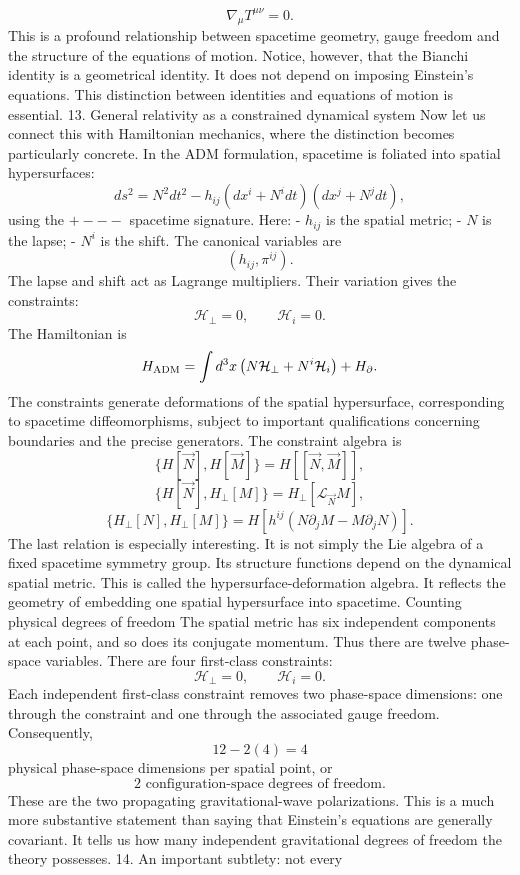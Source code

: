 \[ \nabla_\mu T^{\mu\nu}=0. \] This is a profound relationship between
spacetime geometry, gauge freedom and the structure of the equations of motion.
Notice, however, that the Bianchi identity is a geometrical identity. It does
not depend on imposing Einstein's equations. This distinction between
identities and equations of motion is essential. 13. General relativity as a
constrained dynamical system Now let us connect this with Hamiltonian
mechanics, where the distinction becomes particularly concrete. In the ADM
formulation, spacetime is foliated into spatial hypersurfaces: \[ ds^2=N^2dt^2
-h_{ij}(dx^i+N^i dt)(dx^j+N^jdt), \] using the \(+---\) spacetime signature.
Here: - \(h_{ij}\) is the spatial metric; - \(N\) is the lapse; - \(N^i\) is
the shift. The canonical variables are \[ (h_{ij},\pi^{ij}). \] The lapse and
shift act as Lagrange multipliers. Their variation gives the constraints: \[
    \mathcal H_\perp=0, \qquad \mathcal H_i=0. \] The Hamiltonian is \[ H_{\rm
ADM} = \int d^3x \left( N\mathcal H_\perp+N^i\mathcal H_i \right)
+H_{\partial}. \] The constraints generate deformations of the spatial
hypersurface, corresponding to spacetime diffeomorphisms, subject to important
qualifications concerning boundaries and the precise generators. The constraint
algebra is \[ \{H[\vec N],H[\vec M]\} =H[[\vec N,\vec M]], \] \[ \{H[\vec
N],H_\perp[M]\} =H_\perp[\mathcal L_{\vec N}M], \] \[ \{H_\perp[N],H_\perp[M]\}
= H\left[ h^{ij}(N\partial_jM-M\partial_jN) \right]. \] The last relation is
especially interesting. It is not simply the Lie algebra of a fixed spacetime
symmetry group. Its structure functions depend on the dynamical spatial metric.
This is called the hypersurface-deformation algebra. It reflects the geometry
of embedding one spatial hypersurface into spacetime. Counting physical degrees
of freedom The spatial metric has six independent components at each point, and
so does its conjugate momentum. Thus there are twelve phase-space variables.
There are four first-class constraints: \[ \mathcal H_\perp=0,\qquad \mathcal
H_i=0. \] Each independent first-class constraint removes two phase-space
dimensions: one through the constraint and one through the associated gauge
freedom. Consequently, \[ 12-2(4)=4 \] physical phase-space dimensions per
spatial point, or \[ \boxed{2\text{ configuration-space degrees of freedom}.}
\] These are the two propagating gravitational-wave polarizations. This is a
much more substantive statement than saying that Einstein's equations are
generally covariant. It tells us how many independent gravitational degrees of
freedom the theory possesses. 14. An important subtlety: not every
